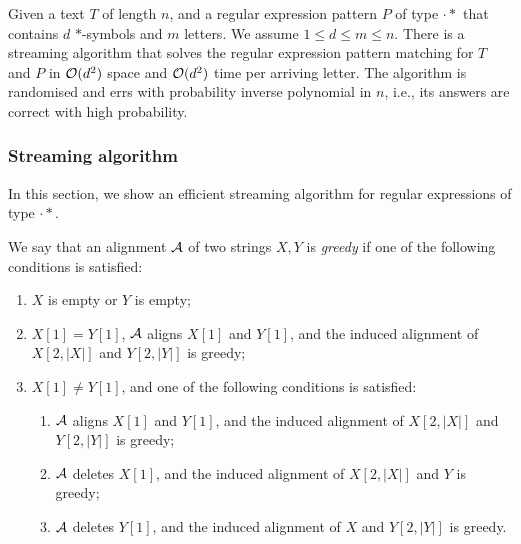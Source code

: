\documentclass{article}
\begin{document}
%
%



\begin{corollary}
Given a text $T$ of length $n$, and a regular expression pattern $P$ of type $\cdot*$ that contains $d$ $*$-symbols and $m$ letters. We assume $1 \leq d \leq m \leq n$. There is a streaming algorithm that solves the regular expression pattern matching for $T$ and $P$ in $\mathcal{O}(d^2)$ space and $\mathcal{O}(d^2)$ time per arriving letter. The  algorithm  is  randomised  and  errs  with  probability inverse polynomial in $n$, i.e., its answers are correct with high probability.
\end{corollary}


\subsubsection{Streaming algorithm}
In this section, we show an efficient streaming algorithm for regular expressions of type $\cdot*$.

\begin{definition}\label{def:greedy_alignment}
We say that an alignment $\mathcal{A}$ of two strings $X, Y$ is \emph{greedy} if one of the following conditions is satisfied:
\begin{enumerate}
\item $X$ is empty or $Y$ is empty;
\item \label{it:first_letters_equal} $X[1] = Y[1]$, $\mathcal{A}$ aligns $X[1]$ and $Y[1]$, and the induced alignment of $X[2,|X|]$ and $Y[2,|Y|]$ is greedy;
\item \label{it:substitution} $X[1] \neq Y[1]$, and one of the following conditions is satisfied:
\begin{enumerate}
\item $\mathcal{A}$ aligns $X[1]$ and $Y[1]$, and the induced alignment of $X[2,|X|]$ and $Y[2,|Y|]$ is greedy;
\item $\mathcal{A}$ deletes $X[1]$, and the induced alignment of $X[2,|X|]$ and $Y$ is greedy;
\item \label{it:deletion} $\mathcal{A}$ deletes $Y[1]$, and the induced alignment of $X$ and $Y[2,|Y|]$ is greedy.
\end{enumerate}
\end{enumerate}
\end{definition}
\end{document}
